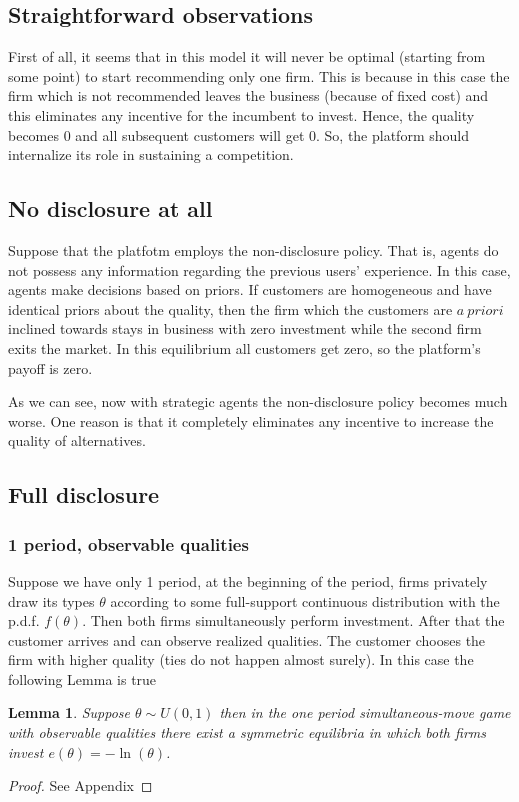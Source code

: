 \documentclass[a4paper]{article}
\newtheorem{lemma}[theorem]{Lemma}
\begin{document}
\subsection{Straightforward observations}
First of all, it seems that in this model it will never be optimal (starting from some point) to start recommending only one firm. This is because in this case the firm which is not recommended leaves the business (because of fixed cost) and this eliminates any incentive for the incumbent to invest. Hence, the quality becomes $0$ and all subsequent customers will get 0. So, the platform should internalize its role in sustaining a competition.
\subsection{No disclosure at all}
Suppose that the platfotm employs the non-disclosure policy. That is, agents do not possess any information regarding the previous users' experience. In this case, agents make decisions based on priors. If customers are homogeneous and have identical priors about the quality, then the firm which the customers are $a\ priori$ inclined towards stays in business with zero investment while the second firm exits the market. In this equilibrium all customers get zero, so the platform's payoff is zero. 


As we can see, now with strategic agents the non-disclosure policy becomes much worse. One reason is that it completely eliminates any incentive to increase the quality of alternatives.




\subsection{Full disclosure}
\subsubsection{1 period, observable qualities}
Suppose we have only 1 period, at the beginning of the period, firms privately draw its types $\theta$ according to some full-support continuous distribution with the p.d.f. $f(\theta)$. Then both firms simultaneously perform investment. After that the customer arrives and can observe realized qualities. The customer chooses the firm with higher quality (ties do not happen almost surely).
In this case the following Lemma is true
\begin{lemma}
	Suppose $\theta \sim U(0, 1)$ then
	in the one period simultaneous-move game with observable qualities there exist a symmetric equilibria in which both firms invest $e(\theta) = -\ln(\theta)$.
\end{lemma}
\begin{proof}
	See Appendix
\end{proof}
\end{document}
